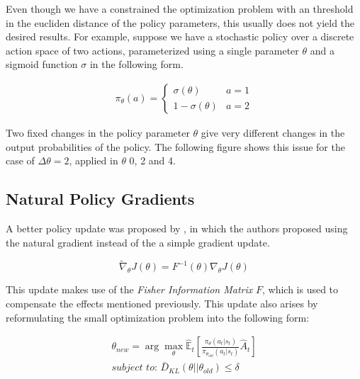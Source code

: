 Even though we have a constrained the optimization problem with an threshold in the
eucliden distance of the policy parameters, this usually does not yield the desired
results. For example, suppose we have a stochastic policy over a discrete action
space of two actions, parameterized using a single parameter  $\theta$ and a sigmoid 
function $\sigma$ in the following form.

\begin{gather*}
    \pi_{\theta}(a) = 
            \begin{cases}
                \sigma(\theta)          & a = 1 \\
                1 - \sigma({\theta})    & a = 2
            \end{cases}
\end{gather*}

Two fixed changes in the policy parameter $\theta$ give very different changes in
the output probabilities of the policy. The following figure shows this issue for
the case of $\Delta \theta=2$, applied in $\theta$ 0, 2 and 4.

\figPolicyChanges

\subsection{Natural Policy Gradients}

A better policy update was proposed by \cite{NaturalPolicyGradient}, in which
the authors proposed using the natural gradient instead of the a simple gradient 
update.

\begin{equation}
    \tilde{\nabla}_{\theta} J(\theta) = F^{-1}(\theta) \nabla_{\theta} J(\theta)
\end{equation}

This update makes use of the \textit{Fisher Information Matrix} $F$, which is used
to compensate the effects mentioned previously. This update also arises by reformulating
the small optimization problem into the following form:

\begin{align} \label{eq:}
    \theta_{new} = \arg \max_{\theta} \mathbb{\hat E}_{t} 
                        \left [
                            \frac{\pi_{\theta}(a_{t}|s_{t})}
                                 {\pi_{\theta_{old}}(a_{t}|s_{t})} \hat A_{t}
                        \right ] \nonumber \\
    \textit{subject to: } 
                \bar{D}_{KL}(\theta||\theta_{old}) \leq \delta
\end{align}

